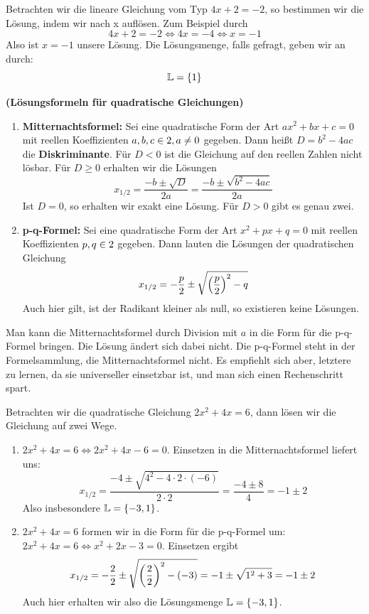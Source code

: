 \documentclass[ngerman, 12pt]{nssheetxea}
\begin{document}
\begin{example}
Betrachten wir die lineare Gleichung vom Typ $4x +2 = -2$, so bestimmen wir die Lösung, indem wir nach x auflösen. Zum Beispiel durch
\[ 4x+2=-2 \Leftrightarrow 4x = -4 \Leftrightarrow x = -1\]
Also ist $x=-1$ unsere Lösung. Die Lösungsmenge, falls gefragt, geben wir an durch:
\[ \mathbb{L} = \{ 1 \}  \]
\end{example}


\begin{theorem} \textbf{(Lösungsformeln für quadratische Gleichungen)}
\begin{enumerate}
\item \textbf{Mitternachtsformel:} Sei eine quadratische Form der Art $ax^2+bx+c=0$ mit reellen Koeffizienten $a,b,c\in 2, a\neq 0$ gegeben. Dann heißt $D=b^2-4ac$ die \textbf{Diskriminante}. Für $D<0$ ist die Gleichung auf den reellen Zahlen nicht lösbar. Für $D\geq 0$ erhalten wir die Lösungen
\[ x_{1/2}=\dfrac{-b\pm \sqrt{D}}{2a} = \dfrac{-b \pm \sqrt{b^2-4ac}}{2a}  \]
Ist $D=0$, so erhalten wir exakt eine Lösung. Für $D>0$ gibt es genau zwei.
\item \textbf{p-q-Formel:} Sei eine quadratische Form der Art $x^2+px+q=0$ mit reellen Koeffizienten $p,q \in 2$ gegeben. Dann lauten die Lösungen der quadratischen Gleichung
\[ x_{1/2} = -\dfrac{p}{2}\pm \sqrt{\mleft(\dfrac{p}{2}\mright)^2-q}  \]
Auch hier gilt, ist der Radikant kleiner als null, so existieren keine Lösungen. 
\end{enumerate}
\label{Satz:MNF_PQ}
\end{theorem}

Man kann die Mitternachtsformel durch Division mit $a$ in die Form für die p-q-Formel bringen. Die Lösung ändert sich dabei nicht. Die p-q-Formel steht in der Formelsammlung, die Mitternachtsformel nicht. Es empfiehlt sich aber, letztere zu lernen, da sie universeller einsetzbar ist, und man sich einen Rechenschritt spart. 

\begin{example}

Betrachten wir die quadratische Gleichung $2x^2+4x=6$, dann lösen wir die Gleichung auf zwei Wege.
\begin{enumerate}
\item $2x^2+4x=6 \Leftrightarrow 2x^2+4x-6=0$. Einsetzen in die Mitternachtsformel liefert uns:
\[ x_{1/2} = \dfrac{-4\pm \sqrt{4^2-4 \cdot 2 \cdot (-6)}}{2\cdot 2} = \dfrac{-4 \pm 8}{4} = -1 \pm 2\]
Also insbesondere $\mathbb{L} = \{ -3, 1\}$.
\item $2x^2+4x=6$ formen wir in die Form für die p-q-Formel um: $2x^2+4x=6 \Leftrightarrow x^2+2x-3=0$. Einsetzen ergibt
\[ x_{1/2} = -\dfrac{2}{2} \pm \sqrt{\mleft( \dfrac{2}{2}\mright)^2 - (-3)} = -1 \pm \sqrt{1^2+3} = -1 \pm 2  \]
Auch hier erhalten wir also die Lösungsmenge $\mathbb{L} = \{ -3, 1\}$.
\end{enumerate}
\label{Bsp:Quadrat_Gl}
\end{example}
\end{document}
